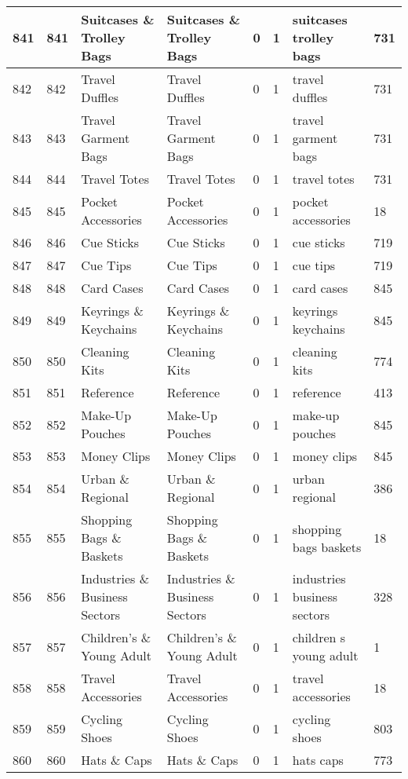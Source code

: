 \begin{longtable}{|l|l|l|l|l|l|l|l|}
841 & 841 & Suitcases \& Trolley Bags & Suitcases \& Trolley Bags & 0 & 1 & suitcases trolley bags & 731 \\ \hline 
842 & 842 & Travel Duffles & Travel Duffles & 0 & 1 & travel duffles & 731 \\ \hline 
843 & 843 & Travel Garment Bags & Travel Garment Bags & 0 & 1 & travel garment bags & 731 \\ \hline 
844 & 844 & Travel Totes & Travel Totes & 0 & 1 & travel totes & 731 \\ \hline 
845 & 845 & Pocket Accessories & Pocket Accessories & 0 & 1 & pocket accessories & 18 \\ \hline 
846 & 846 & Cue Sticks & Cue Sticks & 0 & 1 & cue sticks & 719 \\ \hline 
847 & 847 & Cue Tips & Cue Tips & 0 & 1 & cue tips & 719 \\ \hline 
848 & 848 & Card Cases & Card Cases & 0 & 1 & card cases & 845 \\ \hline 
849 & 849 & Keyrings \& Keychains & Keyrings \& Keychains & 0 & 1 & keyrings keychains & 845 \\ \hline 
850 & 850 & Cleaning Kits & Cleaning Kits & 0 & 1 & cleaning kits & 774 \\ \hline 
851 & 851 & Reference & Reference & 0 & 1 & reference & 413 \\ \hline 
852 & 852 & Make-Up Pouches & Make-Up Pouches & 0 & 1 & make-up pouches & 845 \\ \hline 
853 & 853 & Money Clips & Money Clips & 0 & 1 & money clips & 845 \\ \hline 
854 & 854 & Urban \& Regional & Urban \& Regional & 0 & 1 & urban regional & 386 \\ \hline 
855 & 855 & Shopping Bags \& Baskets & Shopping Bags \& Baskets & 0 & 1 & shopping bags baskets & 18 \\ \hline 
856 & 856 & Industries \& Business Sectors & Industries \& Business Sectors & 0 & 1 & industries business sectors & 328 \\ \hline 
857 & 857 & Children's \& Young Adult & Children's \& Young Adult & 0 & 1 & children s young adult & 1 \\ \hline 
858 & 858 & Travel Accessories & Travel Accessories & 0 & 1 & travel accessories & 18 \\ \hline 
859 & 859 & Cycling Shoes & Cycling Shoes & 0 & 1 & cycling shoes & 803 \\ \hline 
860 & 860 & Hats \& Caps & Hats \& Caps & 0 & 1 & hats caps & 773 \\ \hline 

\end{longtable}
